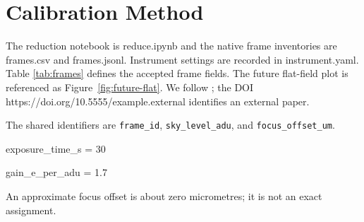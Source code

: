 \documentclass{article}
\begin{document}
\section{Calibration Method}
The reduction notebook is reduce.ipynb and the native frame inventories are
frames.csv and frames.jsonl. Instrument settings are recorded in instrument.yaml. Table
\ref{tab:frames} defines the accepted frame fields. The future flat-field plot
is referenced as Figure~\ref{fig:future-flat}. We follow \cite{ortega2025}; the
DOI https://doi.org/10.5555/example.external identifies an external paper.

The shared identifiers are \texttt{frame_id}, \texttt{sky_level_adu}, and
\texttt{focus_offset_um}.

exposure_time_s = 30

gain_e_per_adu = 1.7

An approximate focus offset is about zero micrometres; it is not an exact
assignment.
\end{document}
